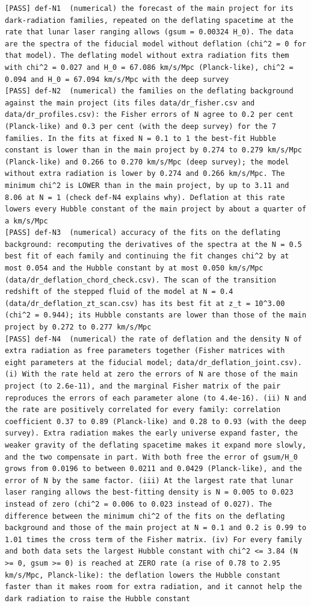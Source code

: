 \documentclass[
  10pt,
]{article}
\begin{document}
\begin{verbatim}
[PASS] def-N1  (numerical) the forecast of the main project for its dark-radiation families, repeated on the deflating spacetime at the rate that lunar laser ranging allows (gsum = 0.00324 H_0). The data are the spectra of the fiducial model without deflation (chi^2 = 0 for that model). The deflating model without extra radiation fits them with chi^2 = 0.027 and H_0 = 67.086 km/s/Mpc (Planck-like), chi^2 = 0.094 and H_0 = 67.094 km/s/Mpc with the deep survey
[PASS] def-N2  (numerical) the families on the deflating background against the main project (its files data/dr_fisher.csv and data/dr_profiles.csv): the Fisher errors of N agree to 0.2 per cent (Planck-like) and 0.3 per cent (with the deep survey) for the 7 families. In the fits at fixed N = 0.1 to 1 the best-fit Hubble constant is lower than in the main project by 0.274 to 0.279 km/s/Mpc (Planck-like) and 0.266 to 0.270 km/s/Mpc (deep survey); the model without extra radiation is lower by 0.274 and 0.266 km/s/Mpc. The minimum chi^2 is LOWER than in the main project, by up to 3.11 and 8.06 at N = 1 (check def-N4 explains why). Deflation at this rate lowers every Hubble constant of the main project by about a quarter of a km/s/Mpc
[PASS] def-N3  (numerical) accuracy of the fits on the deflating background: recomputing the derivatives of the spectra at the N = 0.5 best fit of each family and continuing the fit changes chi^2 by at most 0.054 and the Hubble constant by at most 0.050 km/s/Mpc (data/dr_deflation_chord_check.csv). The scan of the transition redshift of the stepped fluid of the model at N = 0.4 (data/dr_deflation_zt_scan.csv) has its best fit at z_t = 10^3.00 (chi^2 = 0.944); its Hubble constants are lower than those of the main project by 0.272 to 0.277 km/s/Mpc
[PASS] def-N4  (numerical) the rate of deflation and the density N of extra radiation as free parameters together (Fisher matrices with eight parameters at the fiducial model; data/dr_deflation_joint.csv). (i) With the rate held at zero the errors of N are those of the main project (to 2.6e-11), and the marginal Fisher matrix of the pair reproduces the errors of each parameter alone (to 4.4e-16). (ii) N and the rate are positively correlated for every family: correlation coefficient 0.37 to 0.89 (Planck-like) and 0.28 to 0.93 (with the deep survey). Extra radiation makes the early universe expand faster, the weaker gravity of the deflating spacetime makes it expand more slowly, and the two compensate in part. With both free the error of gsum/H_0 grows from 0.0196 to between 0.0211 and 0.0429 (Planck-like), and the error of N by the same factor. (iii) At the largest rate that lunar laser ranging allows the best-fitting density is N = 0.005 to 0.023 instead of zero (chi^2 = 0.006 to 0.023 instead of 0.027). The difference between the minimum chi^2 of the fits on the deflating background and those of the main project at N = 0.1 and 0.2 is 0.99 to 1.01 times the cross term of the Fisher matrix. (iv) For every family and both data sets the largest Hubble constant with chi^2 <= 3.84 (N >= 0, gsum >= 0) is reached at ZERO rate (a rise of 0.78 to 2.95 km/s/Mpc, Planck-like): the deflation lowers the Hubble constant faster than it makes room for extra radiation, and it cannot help the dark radiation to raise the Hubble constant

\end{verbatim}
\end{document}
